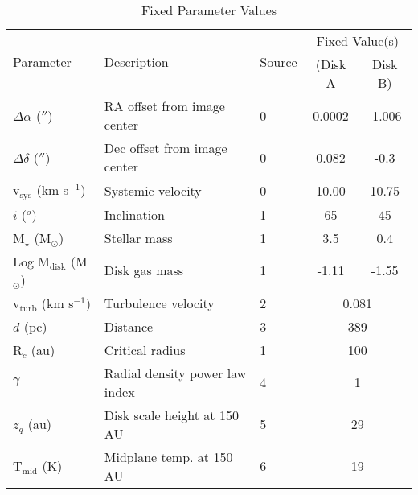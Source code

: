 \begin{table}
  \begin{threeparttable}
    \centering
    \caption{Fixed Parameter Values}
    \label{table:fixed_params}
    \renewcommand{\arraystretch}{1.2}
    \begin{tabular}{l  l  l  c  c }
      \toprule \toprule
      \multirow{2}{*}{Parameter} & \multirow{2}{*}{Description} & \multirow{2}{*}{Source} & \multicolumn{2}{c}{Fixed Value(s)} \\
                                 &                              &                         & (Disk A & Disk B) \\
      \midrule %
      $\Delta \alpha$ ($''$)       &  RA offset from image center     & 0  & 0.0002 & -1.006  \\
      $\Delta \delta$ ($''$)       &  Dec offset from image center    & 0  & 0.082  & -0.3    \\
      v$_\text{sys}$ (km s$^{-1}$) &  Systemic velocity               & 0  & 10.00  & 10.75   \\
      $i$ ($^o$)                   &  Inclination                     & 1  & 65     & 45      \\
      M$_\star$ (M$_\odot$)        &  Stellar mass                    & 1  & 3.5    & 0.4     \\
      Log M$_\text{disk}$ (M$_\odot$) & Disk gas mass\tnote{*}        & 1  & -1.11  & -1.55   \\
      v$_\text{turb}$ (km s$^{-1}$) &  Turbulence velocity            & 2  & \multicolumn{2}{c}{0.081}   \\
      $d$ (pc)                     &  Distance                        & 3  & \multicolumn{2}{c}{389}   \\
      R$_c$ (au)                   &  Critical radius                 & 1  & \multicolumn{2}{c}{100}\\
      $\gamma$                     &  Radial density power law index  & 4  & \multicolumn{2}{c}{1}\\
      $z_q$ (au)                   &  Disk scale height at 150 AU     & 5  & \multicolumn{2}{c}{29}\\
      T$_\text{mid}$ (K)           &  Midplane temp. at 150 AU        & 6  & \multicolumn{2}{c}{19}\\
      \bottomrule
    \end{tabular}


\end{threeparttable}
\end{table}
